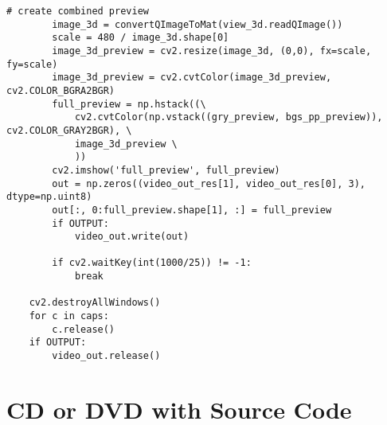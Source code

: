 \begin{lstlisting}[caption={Main function of the volume intersection program}, label={lst:app:volmain}]
        # create combined preview
        image_3d = convertQImageToMat(view_3d.readQImage())
        scale = 480 / image_3d.shape[0]
        image_3d_preview = cv2.resize(image_3d, (0,0), fx=scale, fy=scale)
        image_3d_preview = cv2.cvtColor(image_3d_preview, cv2.COLOR_BGRA2BGR)
        full_preview = np.hstack((\
            cv2.cvtColor(np.vstack((gry_preview, bgs_pp_preview)), cv2.COLOR_GRAY2BGR), \
            image_3d_preview \
            ))
        cv2.imshow('full_preview', full_preview)
        out = np.zeros((video_out_res[1], video_out_res[0], 3), dtype=np.uint8)
        out[:, 0:full_preview.shape[1], :] = full_preview
        if OUTPUT:
            video_out.write(out)

        if cv2.waitKey(int(1000/25)) != -1:
            break

    cv2.destroyAllWindows()
    for c in caps:
        c.release()
    if OUTPUT:
        video_out.release()
\end{lstlisting}

\newpage
\chapter{CD or DVD with Source Code}